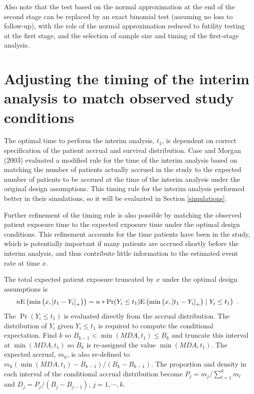\documentclass[12pt]{article}
\newcommand{\E}{\mbox{\rm E}}
\begin{document}
Also note that the test based on the normal approximation
at the end of the second stage can be replaced by an exact binomial test (assuming no loss to
follow-up), with the role of the normal approximation reduced to futility testing at the first
stage, and the selection of sample size and timing of the first-stage analysis.

\section{Adjusting the timing of the interim analysis to match observed study conditions}
\label{timesect}

The optimal time to perform the interim analysis, $t_1$, is dependent on correct specification of
the patient accrual and survival distribution.  Case and Morgan (2003) evaluated a modified rule
for the time of the interim analysis based on matching the number of patients actually accrued in
the study to the expected number of patients to be accrued at the time of the interim analysis
under the original design assumptions.  This timing rule for the interim analysis performed better
in their simulations, so it will be evaluated in Section \ref{simulations}.

Further refinement of the timing rule is also possible by matching the observed patient exposure
time to the expected exposure time under the optimal design conditions.  This refinement accounts
for the time patients have been in the study, which is potentially important if many patients are
accrued shortly before the interim analysis, and thus contribute little information to the
estimated event rate at time $x$.

The total expected patient exposure truncated by $x$ under the optimal design assumptions is
\begin{displaymath}
n\E\left(\min\left(x,\left[t_1-Y_i\right]_+\right)\right)=n*\Pr(Y_i\leq t_1)\E\left(\min\left(x,\left[t_1-Y_i\right]_+\right)\mid Y_i\leq t_1\right)
 \ .
\end{displaymath}
The $\Pr(Y_i\leq t_1)$ is evaluated directly from the accrual distribution.  The distribution of $Y_i$ given $Y_i\leq t_1$ is required to compute the conditional expectation.  Find $k$ so
$B_{k-1}<\min(MDA,t_1)\leq B_k$ and truncate this interval at $\min(MDA,t_1)$ so $B_k$ is re-assigned the value $\min(MDA,t_1)$.  The expected accrual, $m_k$, is also re-defined to
$m_k(\min(MDA,t_1)-B_{k-1})/(B_k-B_{k-1})$.  The  proportion and density in each interval of the conditional accrual distribution become $P_j=m_j/\sum_{l=1}^k m_l$ and $D_j=P_j/(B_j-B_{j-1})$,
$j=1,\cdots,k$.
\end{document}
